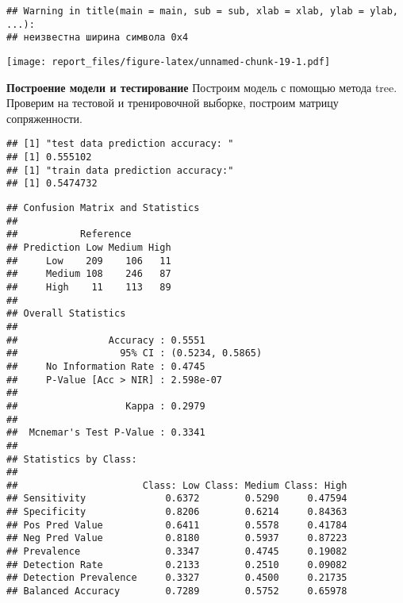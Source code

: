 \documentclass[
]{article}
\newenvironment{Shaded}{\begin{snugshade}}{\end{snugshade}}
\newcommand{\KeywordTok}[1]{\textcolor[rgb]{0.13,0.29,0.53}{\textbf{#1}}}
\newcommand{\NormalTok}[1]{#1}
\newcommand{\OperatorTok}[1]{\textcolor[rgb]{0.81,0.36,0.00}{\textbf{#1}}}
\newcommand{\StringTok}[1]{\textcolor[rgb]{0.31,0.60,0.02}{#1}}
\begin{document}
\begin{verbatim}
## Warning in title(main = main, sub = sub, xlab = xlab, ylab = ylab, ...):
## неизвестна ширина символа 0x4
\end{verbatim}

\texttt{[image: report\_files/figure-latex/unnamed-chunk-19-1.pdf]}

\textbf{Построение модели и тестирование} Построим модель с помощью
метода tree. Проверим на тестовой и тренировочной выборке, построим
матрицу сопряженности.

\begin{Shaded}
\end{Shaded}

\begin{verbatim}
## [1] "test data prediction accuracy: "
## [1] 0.555102
## [1] "train data prediction accuracy:"
## [1] 0.5474732
\end{verbatim}

\begin{verbatim}
## Confusion Matrix and Statistics
## 
##           Reference
## Prediction Low Medium High
##     Low    209    106   11
##     Medium 108    246   87
##     High    11    113   89
## 
## Overall Statistics
##                                           
##                Accuracy : 0.5551          
##                  95% CI : (0.5234, 0.5865)
##     No Information Rate : 0.4745          
##     P-Value [Acc > NIR] : 2.598e-07       
##                                           
##                   Kappa : 0.2979          
##                                           
##  Mcnemar's Test P-Value : 0.3341          
## 
## Statistics by Class:
## 
##                      Class: Low Class: Medium Class: High
## Sensitivity              0.6372        0.5290     0.47594
## Specificity              0.8206        0.6214     0.84363
## Pos Pred Value           0.6411        0.5578     0.41784
## Neg Pred Value           0.8180        0.5937     0.87223
## Prevalence               0.3347        0.4745     0.19082
## Detection Rate           0.2133        0.2510     0.09082
## Detection Prevalence     0.3327        0.4500     0.21735
## Balanced Accuracy        0.7289        0.5752     0.65978
\end{verbatim}
\end{document}
